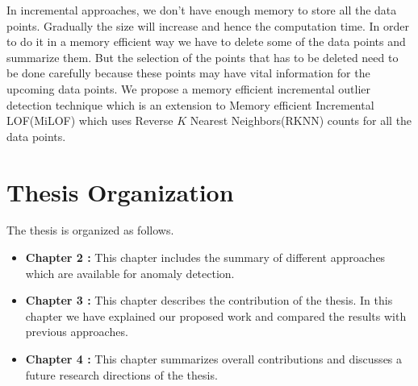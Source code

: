 \par
In incremental approaches, we don't have enough memory to store all the data points. Gradually the size will increase and hence the computation time. In order to do it in a memory efficient way we have to delete some of the data points and summarize them. But the selection of the points that has to be deleted need to be done carefully because these points may have vital information for the upcoming data points. We propose a memory efficient incremental outlier detection technique which is an extension to Memory efficient Incremental LOF(MiLOF) which uses Reverse $K$ Nearest Neighbors(RKNN) counts for all the data points.

\section{Thesis Organization}

The thesis is organized as follows.

\begin{itemize}
	
\item  \textbf{Chapter 2 :} This chapter includes the summary of different approaches which are available for anomaly detection.

\item  \textbf{Chapter 3 :} This chapter describes the contribution of the thesis. In this chapter we have explained our proposed work and compared the results with previous approaches.



\item \textbf{Chapter 4 :} This chapter summarizes overall contributions and discusses a future research
directions of the thesis.

 


\end{itemize}
	




